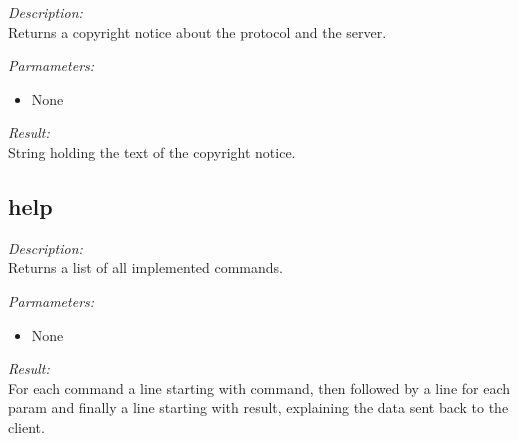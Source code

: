 \begin{description}
\item {\it Description:}\\
Returns a copyright notice about the protocol and the server.
\item {\it Parmameters:}
\begin{itemize}
\item None
\end{itemize}
\item {\it Result:}\\
String holding the text of the copyright notice.
\end{description}

\subsection{help}

\begin{description}
\item {\it Description:}\\
Returns a list of all implemented commands.
\item {\it Parmameters:}
\begin{itemize}
\item None
\end{itemize}
\item {\it Result:}\\
For each command a line starting with command, then followed by a line for each param and finally a line starting with result, explaining the data sent back to the client.
\end{description}

